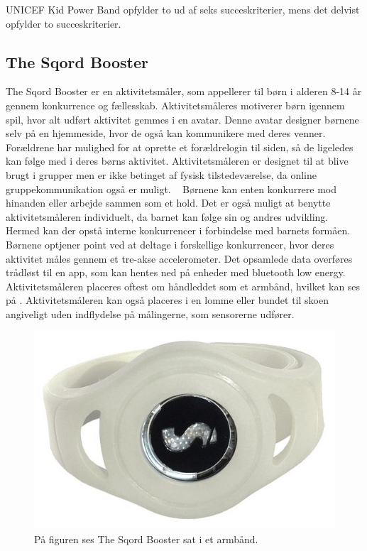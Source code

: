 UNICEF Kid Power Band opfylder to ud af seks succeskriterier, mens det delvist opfylder to succeskriterier.

\subsection{The Sqord Booster}
The Sqord Booster er en aktivitetsmåler, som appellerer til børn i alderen 8-14 år gennem konkurrence og fællesskab. Aktivitetsmåleres motiverer børn igennem spil, hvor alt udført aktivitet gemmes i en avatar. Denne avatar designer børnene selv på en hjemmeside, hvor de også kan kommunikere med deres venner. Forældrene har mulighed for at oprette et forældrelogin til siden, så de ligeledes kan følge med i deres børns aktivitet. Aktivitetsmåleren er designet til at blive brugt i grupper men er ikke betinget af fysisk tilstedeværelse, da online gruppekommunikation også er muligt.%
~\citep{Sqord_family2015} Børnene kan enten konkurrere mod hinanden eller arbejde sammen som et hold. Det er også muligt at benytte aktivitetsmåleren individuelt, da barnet kan følge sin og andres udvikling. Hermed kan der opstå interne konkurrencer i forbindelse med barnets formåen. \citep{Sqord_family2015,Sqord_group2015} \\
Børnene optjener point ved at deltage i forskellige konkurrencer, hvor deres aktivitet måles gennem et tre-akse accelerometer. Det opsamlede data overføres trådløst til en app, som kan hentes ned på enheder med bluetooth low energy. Aktivitetsmåleren placeres oftest om håndleddet som et armbånd, hvilket kan ses på . Aktivitetsmåleren kan også placeres i en lomme eller bundet til skoen angiveligt uden indflydelse på målingerne, som sensorerne udfører. \citep{Sqord_family2015}
\begin{figure}[H]
	\centering
	\includegraphics[scale=0.31]{figures/aProblemanalyse/sqord.JPG}
	\caption{På figuren ses The Sqord Booster sat i et armbånd. \citep{Sqord2016}}
	\label{fig:sqord}
\end{figure}
